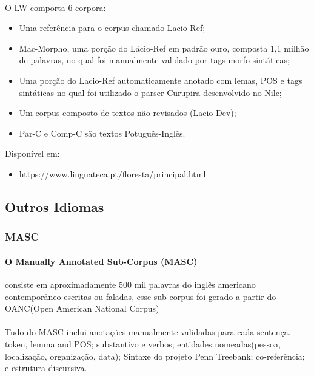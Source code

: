 \documentclass[a4paper, 10pt]{article}
\begin{document}
                \paragraph{}O LW comporta 6 corpora:
                \begin{itemize}
                	\item Uma referência para o corpus chamado Lacio-Ref;
                    \item Mac-Morpho, uma porção do Lácio-Ref em padrão ouro, composta 1,1 milhão de palavras, no qual foi manualmente validado por tags morfo-sintáticas;
                    \item Uma porção do Lacio-Ref automaticamente anotado com lemas, POS e tags sintáticas no qual foi utilizado o parser Curupira desenvolvido no Nilc; 
                    \item Um corpus composto de textos não revisados (Lacio-Dev);
                    \item Par-C e Comp-C são textos Potuguês-Inglês.
                \end{itemize}
                Disponível em:
            	\begin{itemize}
				\item https://www.linguateca.pt/floresta/principal.html

			    \end{itemize}

        \subsection{Outros Idiomas}
        	\subsubsection{MASC}
            	\paragraph{O Manually Annotated Sub-Corpus (MASC)}consiste em aproximadamente 500 mil palavras do inglês americano contemporâneo escritas ou faladas, esse sub-corpus foi gerado a partir do OANC(Open American National Corpus)
                \paragraph{}Tudo do MASC inclui anotações manualmente validadas para cada sentença. token, lemma and POS; substantivo e verbos; entidades nomeadas(pessoa, localização, organização, data); Sintaxe do projeto Penn Treebank; co-referência; e estrutura discursiva.
                
\end{document}
